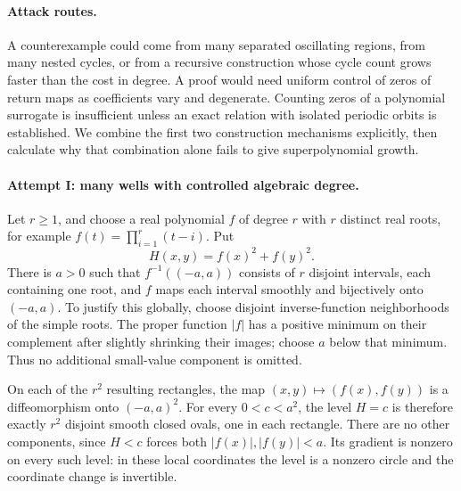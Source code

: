 \documentclass[11pt,a4paper]{article}
\numberwithin{equation}{section}
\begin{document}
\paragraph{Attack routes.}
A counterexample could come from many separated oscillating regions,
from many nested cycles, or from a recursive construction whose cycle
count grows faster than the cost in degree.  A proof would need uniform
control of zeros of return maps as coefficients vary and degenerate.
Counting zeros of a polynomial surrogate is insufficient unless an exact
relation with isolated periodic orbits is established.  We combine the
first two construction mechanisms explicitly, then calculate why that
combination alone fails to give superpolynomial growth.

\paragraph{Attempt I: many wells with controlled algebraic degree.}
Let $r\geq1$, and choose a real polynomial $f$ of degree $r$ with $r$
distinct real roots, for example $f(t)=\prod_{i=1}^r(t-i)$.  Put
\[
 H(x,y)=f(x)^2+f(y)^2.
\]
There is $a>0$ such that $f^{-1}((-a,a))$ consists of $r$ disjoint
intervals, each containing one root, and $f$ maps each interval
smoothly and bijectively onto $(-a,a)$.  To justify this globally,
choose disjoint inverse-function neighborhoods of the simple roots.
The proper function $|f|$ has a positive minimum on their complement
after slightly shrinking their images; choose $a$ below that minimum.
Thus no additional small-value component is omitted.

On each of the $r^2$ resulting rectangles, the map
$(x,y)\mapsto(f(x),f(y))$ is a diffeomorphism onto $(-a,a)^2$.
For every $0<c<a^2$, the level $H=c$ is therefore exactly $r^2$
disjoint smooth closed ovals, one in each rectangle.  There are no other
components, since $H<c$ forces both $|f(x)|,|f(y)|<a$.  Its gradient
is nonzero on every such level: in these local coordinates the level
is a nonzero circle and the coordinate change is invertible.
\end{document}
